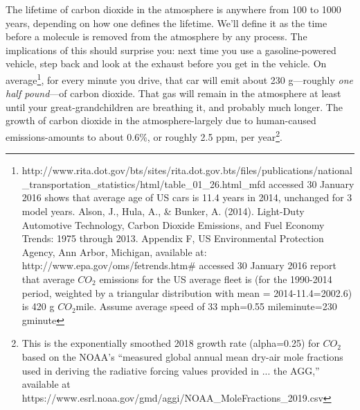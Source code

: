 \documentclass[amstex,12pt]{book}
\begin{document}
The lifetime of carbon dioxide in the atmosphere is anywhere from 100 to 1000 years, depending on how one defines the lifetime. We'll define it as the time before a molecule is removed from the atmosphere by any process. The implications of this should surprise you: next time you use a gasoline-powered vehicle, step back and look at the exhaust before you get in the vehicle. On average\footnote{http://www.rita.dot.gov/bts/sites/rita.dot.gov.bts/files/publications/national\_transportation\_statistics/html/table\_01\_26.html\_mfd accessed 30 January 2016 shows that average age of US cars is 11.4 years in 2014, unchanged for 3 model years.  Alson, J., Hula, A., \& Bunker, A. (2014). Light-Duty Automotive Technology, Carbon Dioxide Emissions, and Fuel Economy Trends: 1975 through 2013. Appendix F, US Environmental Protection Agency, Ann Arbor, Michigan, available at: http://www.epa.gov/oms/fetrends.htm\# accessed 30 January 2016 report that average $CO_2$ emissions for the US average fleet is (for the 1990-2014 period, weighted by a triangular distribution with mean = 2014-11.4=2002.6) is 420 g $CO_2$\/mile. Assume average speed of 33 mph=0.55 mile\/minute=230 g\/minute}, for every minute you drive, that car will emit about 230 g---roughly \emph{one half pound}---of carbon dioxide. That gas will remain in the atmosphere at least until your great-grandchildren are breathing it, and probably much longer. The growth of carbon dioxide in the atmosphere-largely due to human-caused emissions-amounts to about 0.6\%, or roughly 2.5 ppm, per year\footnote{This is the exponentially smoothed 2018 growth rate (alpha=0.25) for $CO_2$ based on the NOAA's ``measured global annual mean dry-air mole fractions used in deriving the radiative forcing values provided in ... the AGG,'' available at https://www.esrl.noaa.gov/gmd/aggi/NOAA\_MoleFractions\_2019.csv}.\\
\end{document}
